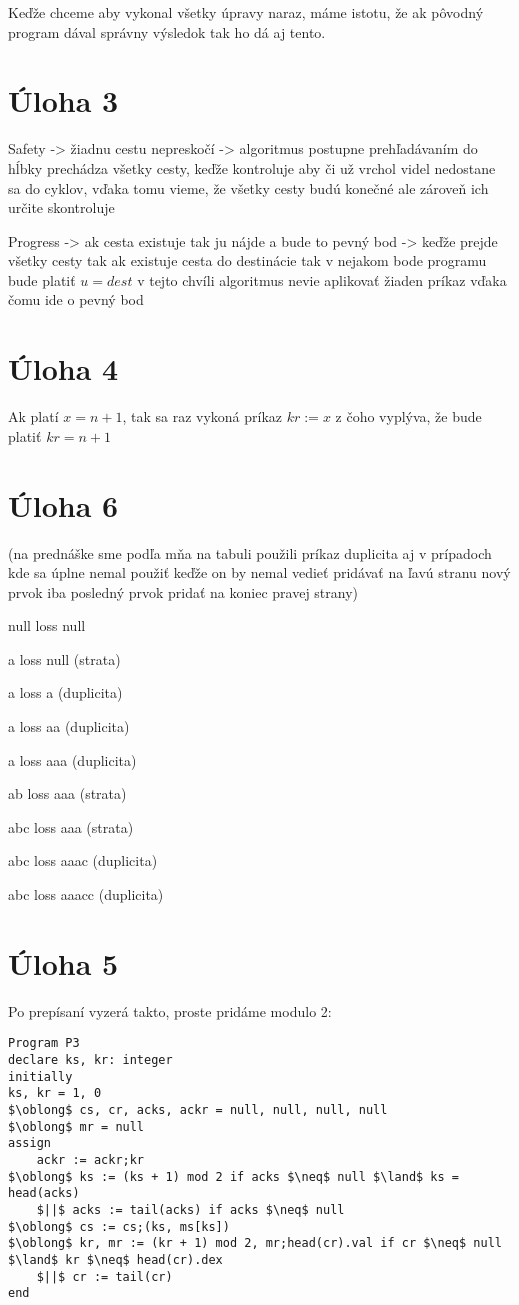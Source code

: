 \documentclass[a4paper]{article}
\begin{document}
Keďže chceme aby vykonal všetky úpravy naraz, máme istotu, že ak pôvodný program dával správny výsledok tak ho dá aj tento.

\section{Úloha 3}

Safety -> žiadnu cestu nepreskočí -> algoritmus postupne prehľadávaním do hĺbky prechádza všetky cesty, keďže kontroluje aby či už vrchol videl nedostane sa do cyklov, vďaka tomu vieme, že všetky cesty budú konečné ale zároveň ich určite skontroluje 

Progress -> ak cesta existuje tak ju nájde a bude to pevný bod -> keďže prejde všetky cesty tak ak existuje cesta do destinácie tak v nejakom bode programu bude platiť $u=dest$ v tejto chvíli algoritmus nevie aplikovať žiaden príkaz vďaka čomu ide o pevný bod

\section{Úloha 4}

Ak platí $x = n+1$, tak sa raz vykoná príkaz $kr := x$ z čoho vyplýva, že bude platiť $kr = n+1$ 

\section{Úloha 6}
(na prednáške sme podľa mňa na tabuli použili príkaz duplicita aj v prípadoch kde sa úplne nemal použiť keďže on by nemal vedieť pridávať na ľavú stranu nový prvok iba posledný prvok pridať na koniec pravej strany)

null loss null

a loss null (strata)

a loss a (duplicita)

a loss aa (duplicita)

a loss aaa (duplicita)

ab loss aaa (strata)

abc loss aaa (strata)

abc loss aaac (duplicita)

abc loss aaacc (duplicita)

\section{Úloha 5}

Po prepísaní vyzerá takto, proste pridáme modulo 2:

\begin{lstlisting}
Program P3
declare ks, kr: integer
initially
ks, kr = 1, 0
$\oblong$ cs, cr, acks, ackr = null, null, null, null
$\oblong$ mr = null
assign
	ackr := ackr;kr
$\oblong$ ks := (ks + 1) mod 2 if acks $\neq$ null $\land$ ks = head(acks)
	$||$ acks := tail(acks) if acks $\neq$ null
$\oblong$ cs := cs;(ks, ms[ks])
$\oblong$ kr, mr := (kr + 1) mod 2, mr;head(cr).val if cr $\neq$ null $\land$ kr $\neq$ head(cr).dex
	$||$ cr := tail(cr)
end
\end{lstlisting}
\end{document}
